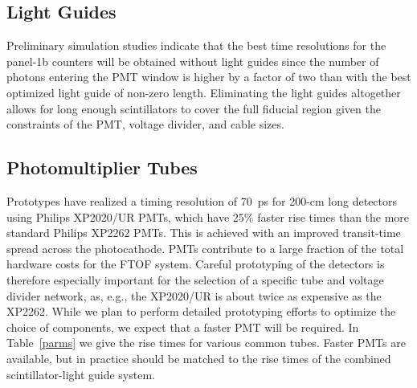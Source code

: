 \subsection{Light Guides}
\label{lgs}

Preliminary simulation studies indicate that the best time resolutions 
for the panel-1b counters will be obtained without light guides since 
the number of photons entering the PMT window is higher by a factor of 
two than with the best optimized light guide of non-zero length.  
Eliminating the light guides altogether allows for long enough 
scintillators to cover the full fiducial region given the constraints of 
the PMT, voltage divider, and cable sizes.

\subsection{Photomultiplier Tubes}
\label{sec:pmt}

Prototypes have realized a timing resolution of 70~ps for 200-cm long 
detectors using Philips XP2020/UR PMTs, which have 25\% faster rise times 
than the more standard Philips XP2262 PMTs.  This is achieved with an 
improved transit-time spread across the photocathode.  PMTs contribute to 
a large fraction of the total hardware costs for the FTOF system.  Careful 
prototyping of the detectors is therefore especially important for the 
selection of a specific tube and voltage divider network, as, e.g., the 
XP2020/UR is about twice as expensive as the XP2262.  While we plan to 
perform detailed prototyping efforts to optimize the choice of components, 
we expect that a faster PMT will be required.  In Table~\ref{parms} we 
give the rise times for various common tubes.  Faster PMTs are available, 
but in practice should be matched to the rise times of the combined 
scintillator-light guide system.  

